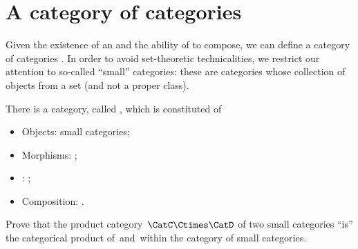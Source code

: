 \section{A category of categories}

Given the existence of an  and the ability of  to compose, we can define a category of categories \Category.
In order to avoid set-theoretic technicalities, we restrict our attention to so-called ``small'' categories: these are categories whose collection of objects from a set (and not a proper class).

\begin{ctdefinition}
    \label{def:Category}
    There is a category, called \Category, which is constituted of
    \begin{itemize}
        \item Objects: small categories;
        \item Morphisms: ;
        \item {}: ;
        \item Composition: .
    \end{itemize}
\end{ctdefinition}
\vfill
\begin{gradedexercise}
    Prove that the product category~$\CatC \Ctimes \CatD$ of two small categories ``is'' the categorical product of~\CatC and~\CatD within the category of small categories.
\end{gradedexercise}
